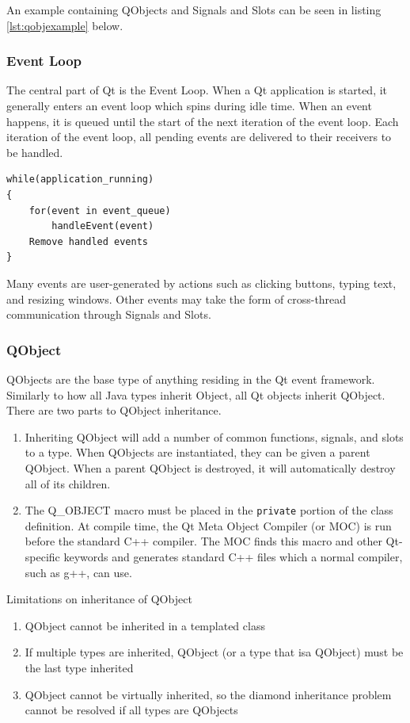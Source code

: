 	An example containing QObjects and Signals and Slots can be seen in listing \ref{lst:qobjexample} below.
	
\subsubsection*{Event Loop}
	The central part of Qt is the Event Loop. When a Qt application is started, it generally enters an event loop which spins during idle time. When an event happens, it is queued until the start of the next iteration of the event loop. Each iteration of the event loop, all pending events are delivered to their receivers to be handled.
	
	\begin{lstlisting}[caption={Pseudocode for the Qt Event Loop}]
while(application_running)
{
	for(event in event_queue)
		handleEvent(event)
	Remove handled events
}
	\end{lstlisting}
	
	Many events are user-generated by actions such as clicking buttons, typing text, and resizing windows. Other events may take the form of cross-thread communication through Signals and Slots.
	
\subsubsection*{QObject}
	QObjects are the base type of anything residing in the Qt event framework. Similarly to how all Java types inherit Object, all Qt objects inherit QObject. There are two parts to QObject inheritance.
	\begin{enumerate}
		\item Inheriting QObject will add a number of common functions, signals, and slots to a type. When QObjects are instantiated, they can be given a parent QObject. When a parent QObject is destroyed, it will automatically destroy all of its children.
		\item The Q\_OBJECT macro must be placed in the \lstinline|private| portion of the class definition. At compile time, the Qt Meta Object Compiler (or MOC) is run before the standard C++ compiler. The MOC finds this macro and other Qt-specific keywords and generates standard C++ files which a normal compiler, such as g++, can use.
	\end{enumerate}
	
	Limitations on inheritance of QObject
\begin{enumerate}
	\item QObject cannot be inherited in a templated class
	\item If multiple types are inherited, QObject (or a type that isa QObject) must be the last type inherited
	\item QObject cannot be virtually inherited, so the diamond inheritance problem cannot be resolved if all types are QObjects
\end{enumerate}
	
